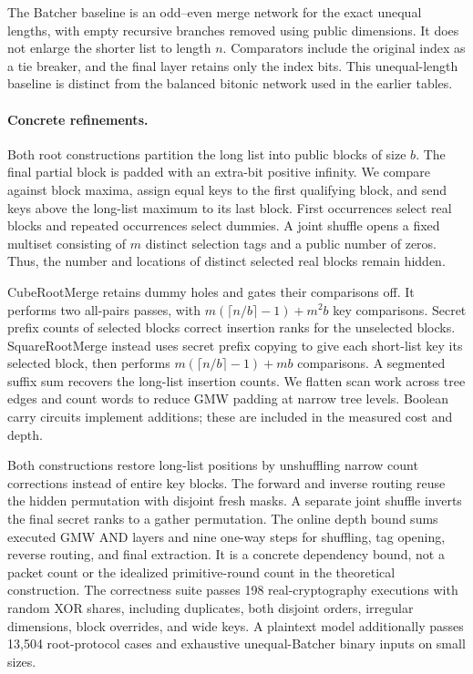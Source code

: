 The Batcher baseline is an odd--even merge network for the exact unequal
lengths, with empty recursive branches removed using public dimensions.
It does not enlarge the shorter list to length $n$.
Comparators include the original index as a tie breaker, and the final layer
retains only the index bits. This unequal-length baseline is distinct from
the balanced bitonic network used in the earlier tables.

\paragraph{Concrete refinements.}
Both root constructions partition the long list into public blocks of size $b$.
The final partial block is padded with an extra-bit positive infinity.
We compare against block maxima, assign equal keys to the first qualifying
block, and send keys above the long-list maximum to its last block.
First occurrences select real blocks and repeated occurrences select dummies.
A joint shuffle opens a fixed multiset consisting of $m$ distinct selection
tags and a public number of zeros. Thus, the number and locations of distinct
selected real blocks remain hidden.

CubeRootMerge retains dummy holes and gates their comparisons off. It performs
two all-pairs passes, with $m(\lceil n/b\rceil-1)+m^2b$ key comparisons.
Secret prefix counts of selected blocks correct insertion ranks for the
unselected blocks. SquareRootMerge instead uses secret prefix copying to give
each short-list key its selected block, then performs
$m(\lceil n/b\rceil-1)+mb$ comparisons. A segmented suffix sum recovers the
long-list insertion counts. We flatten scan work across tree edges and count
words to reduce GMW padding at narrow tree levels. Boolean carry circuits
implement additions; these are included in the measured cost and depth.

Both constructions restore long-list positions by unshuffling narrow count
corrections instead of entire key blocks. The forward and inverse routing
reuse the hidden permutation with disjoint fresh masks. A separate joint
shuffle inverts the final secret ranks to a gather permutation.
The online depth bound sums executed GMW AND layers and nine one-way steps for
shuffling, tag opening, reverse routing, and final extraction.
It is a concrete dependency bound, not a packet count or the idealized
primitive-round count in the theoretical construction.
The correctness suite passes 198 real-cryptography executions with random
XOR shares, including duplicates, both disjoint orders, irregular dimensions,
block overrides, and wide keys. A plaintext model additionally passes 13,504
root-protocol cases and exhaustive unequal-Batcher binary inputs on small sizes.

